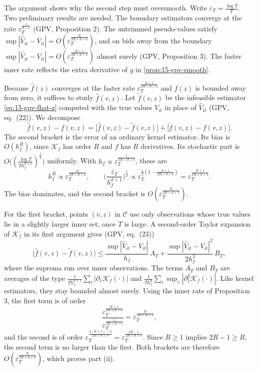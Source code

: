  The argument shows why the second step must oversmooth. Write $\varepsilon_T=\frac{\log T}{T}$. Two preliminary results are needed. The boundary estimators converge at the rate $\varepsilon_T^{\frac{1}{d+1}}$ (GPV, Proposition 2). The untrimmed pseudo-values satisfy $\sup|\hat V_{it}-V_{it}|=O(\varepsilon_T^{\frac{R}{2R+d+3}})$, and on bids away from the boundary $\sup|\hat V_{it}-V_{it}|=O(\varepsilon_T^{\frac{R+1}{2R+d+3}})$ almost surely (GPV, Proposition 3). The faster inner rate reflects the extra derivative of $g$ in \cref{prop:15-gpv-smooth}.

Because $\hat f(z)$ converges at the faster rate $\varepsilon_T^{\frac{R+1}{2R+d+2}}$ and $f(z)$ is bounded away from zero, it suffices to study $\hat f(v,z)$. Let $\tilde f(v,z)$ be the infeasible estimator \eqref{eq:15-gpv-fhat-z} computed with the true values $V_{it}$ in place of $\hat V_{it}$ (GPV, eq.~(22)). We decompose
\[
\hat f(v,z)-f(v,z)=\big[\hat f(v,z)-\tilde f(v,z)\big]+\big[\tilde f(v,z)-f(v,z)\big].
\]
The second bracket is the error of an ordinary kernel estimator. Its bias is $O(h_f^R)$, since $\mathcal K_f$ has order $R$ and $f$ has $R$ derivatives. Its stochastic part is $O\big((\frac{\log T}{Th_f^{d+1}})^{\frac12}\big)$ uniformly. With $h_f\propto\varepsilon_T^{\frac{1}{2R+d+3}}$, these are
\[
h_f^R\propto\varepsilon_T^{\frac{R}{2R+d+3}},\qquad\Big(\frac{\varepsilon_T}{h_f^{d+1}}\Big)^{\frac12}\propto\varepsilon_T^{\frac12\left(1-\frac{d+1}{2R+d+3}\right)}=\varepsilon_T^{\frac{R+1}{2R+d+3}}.
\]
The bias dominates, and the second bracket is $O(\varepsilon_T^{\frac{R}{2R+d+3}})$.

For the first bracket, points $(v,z)$ in $\mathcal C$ use only observations whose true values lie in a slightly larger inner set, once $T$ is large. A second-order Taylor expansion of $\mathcal K_f$ in its first argument gives (GPV, eq.~(23))
\[
\big|\hat f(v,z)-\tilde f(v,z)\big|\le\frac{\sup|\hat V_{it}-V_{it}|}{h_f}\,A_T+\frac{\sup|\hat V_{it}-V_{it}|^2}{2h_f^3}\,B_T,
\]
where the suprema run over inner observations. The terms $A_T$ and $B_T$ are averages of the type $\frac{1}{Th_f^{d+1}}\sum_t|\partial_1\mathcal K_f(\cdot)|$ and $\frac{1}{Th_f^{d}}\sum_t\sup_v|\partial_1^2\mathcal K_f(\cdot)|$. Like kernel estimators, they stay bounded almost surely. Using the inner rate of Proposition 3, the first term is of order
\[
\frac{\varepsilon_T^{\frac{R+1}{2R+d+3}}}{\varepsilon_T^{\frac{1}{2R+d+3}}}=\varepsilon_T^{\frac{R}{2R+d+3}},
\]
and the second is of order $\varepsilon_T^{\frac{2(R+1)-3}{2R+d+3}}=\varepsilon_T^{\frac{2R-1}{2R+d+3}}$. Since $R\ge1$ implies $2R-1\ge R$, the second term is no larger than the first. Both brackets are therefore $O(\varepsilon_T^{\frac{R}{2R+d+3}})$, which proves part (ii).

